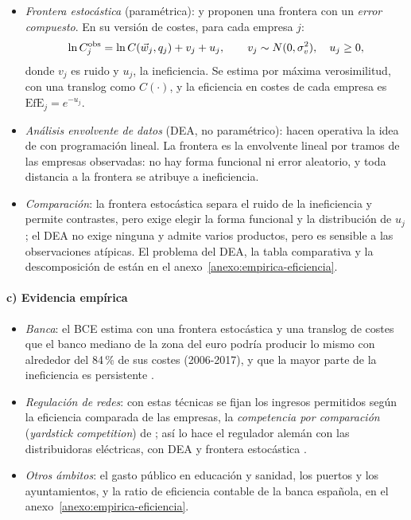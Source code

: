\documentclass[11pt]{article}
\begin{document}
\begin{itemize}
\item \emph{Frontera estocástica} (paramétrica): \textcite{AignerLovellSchmidt1977Formulation} y \textcite{MeeusenVandenBroeck1977Efficiency} proponen una frontera con un \emph{error compuesto}. En su versión de costes, para cada empresa $j$:
  \begin{equation}
  \ln C_j^{\mathrm{obs}}=\ln C(\vec{w}_j,q_j)+v_j+u_j,\qquad v_j\sim N(0,\sigma_v^2),\quad u_j\geq 0, \label{eq:sfa}
  \end{equation}
  donde $v_j$ es ruido y $u_j$, la ineficiencia. Se estima por máxima verosimilitud, con una translog como $C(\cdot)$, y la eficiencia en costes de cada empresa es $\mathrm{EfE}_j=e^{-u_j}$.
\item \emph{Análisis envolvente de datos} (DEA, no paramétrico): \textcite{CharnesCooperRhodes1978Measuring} hacen operativa la idea de  con programación lineal. La frontera es la envolvente lineal por tramos de las empresas observadas: no hay forma funcional ni error aleatorio, y toda distancia a la frontera se atribuye a ineficiencia.
\item \emph{Comparación}: la frontera estocástica separa el ruido de la ineficiencia y permite contrastes, pero exige elegir la forma funcional y la distribución de $u_j$; el DEA no exige ninguna y admite varios productos, pero es sensible a las observaciones atípicas. El problema del DEA, la tabla comparativa y la descomposición de  están en el anexo~\ref{anexo:empirica-eficiencia}.
\end{itemize}

\paragraph{c) Evidencia empírica}

\begin{itemize}
\item \emph{Banca}: el BCE estima con una frontera estocástica y una translog de costes que el banco mediano de la zona del euro podría producir lo mismo con alrededor del 84\,\% de sus costes (2006-2017), y que la mayor parte de la ineficiencia es persistente\nocite{BCE2019EficienciaBancos,BCE2018FSRRecuadro6} .
\item \emph{Regulación de redes}: con estas técnicas se fijan los ingresos permitidos según la eficiencia comparada de las empresas, la \emph{competencia por comparación} (\emph{yardstick competition}) de \textcite{Shleifer1985Theory}; así lo hace el regulador alemán con las distribuidoras eléctricas, con DEA y frontera estocástica\nocite{BNetzA2026Effizienzvergleich}  .
\item \emph{Otros ámbitos}: el gasto público en educación y sanidad, los puertos y los ayuntamientos, y la ratio de eficiencia contable de la banca española, en el anexo~\ref{anexo:empirica-eficiencia}.
\end{itemize}
\end{document}
